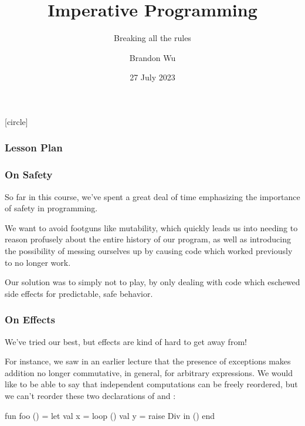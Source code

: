 \documentclass[aspectratio=169]{beamer}
\title{Imperative Programming} %
\subtitle{Breaking all the rules} %
\date{27 July 2023} %
\author{Brandon Wu} %
\newif\ifcolorlambda
\begin{document}
\ifweb
    \renewcommand{\pause}{}
\fi

[circle]

{
\begin{frame}[plain]
    \colorlambdatrue
    \titlepage
\end{frame}
}


\begin{frame}[fragile]
  \frametitle{Lesson Plan}

  \tableofcontents
\end{frame}


\begin{frame}[fragile]
  \frametitle{On Safety}

  So far in this course, we've spent a great deal of time emphasizing the
  importance of safety in programming.

  \pause
  \vspace{\fill}

  We want to avoid footguns like mutability, which quickly leads us into
  needing to reason profusely about the entire history of our program, as well as
  introducing the possibility of messing ourselves up by causing code which worked
  previously to no longer work.

  \pause
  \vspace{\fill}

  Our solution was to simply not to play, by only dealing with  code
  which eschewed side effects for predictable, safe behavior.
\end{frame}

\begin{frame}[fragile]
  \frametitle{On Effects}

  We've tried our best, but effects are kind of hard to get away from!

  \pause
  \vspace{\fill}

  For instance, we saw in an earlier lecture that the presence of exceptions makes
  addition no longer commutative, in general, for arbitrary expressions. We would
  like to be able to say that independent computations can be freely reordered,
  but we can't reorder these two declarations of  and :

  \pause
  \vspace{\fill}

  \begin{codeblock}
    fun foo () =
      let
        val x = loop ()
        val y = raise Div
      in
        ()
      end
  \end{codeblock}
\end{frame}
\end{document}
